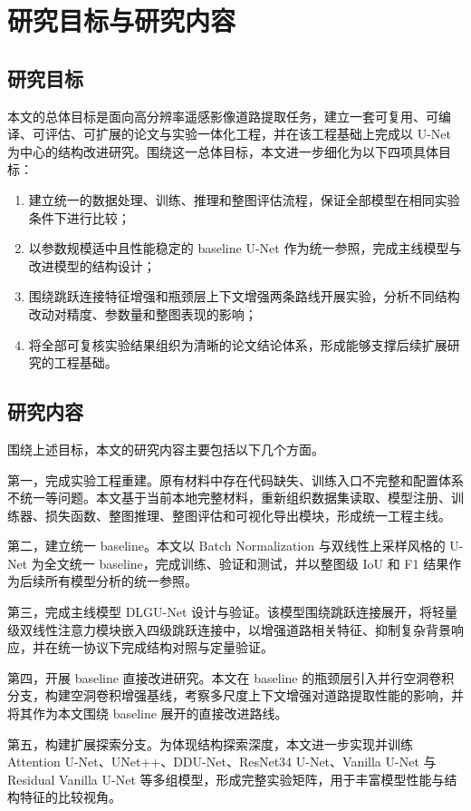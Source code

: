 \section{研究目标与研究内容}
\subsection{研究目标}
本文的总体目标是面向高分辨率遥感影像道路提取任务，建立一套可复用、可编译、可评估、可扩展的论文与实验一体化工程，并在该工程基础上完成以 U-Net 为中心的结构改进研究。围绕这一总体目标，本文进一步细化为以下四项具体目标：
\begin{enumerate}
  \item 建立统一的数据处理、训练、推理和整图评估流程，保证全部模型在相同实验条件下进行比较；
  \item 以参数规模适中且性能稳定的 baseline U-Net 作为统一参照，完成主线模型与改进模型的结构设计；
  \item 围绕跳跃连接特征增强和瓶颈层上下文增强两条路线开展实验，分析不同结构改动对精度、参数量和整图表现的影响；
  \item 将全部可复核实验结果组织为清晰的论文结论体系，形成能够支撑后续扩展研究的工程基础。
\end{enumerate}

\subsection{研究内容}
围绕上述目标，本文的研究内容主要包括以下几个方面。

第一，完成实验工程重建。原有材料中存在代码缺失、训练入口不完整和配置体系不统一等问题。本文基于当前本地完整材料，重新组织数据集读取、模型注册、训练器、损失函数、整图推理、整图评估和可视化导出模块，形成统一工程主线。

第二，建立统一 baseline。本文以 Batch Normalization 与双线性上采样风格的 U-Net 为全文统一 baseline，完成训练、验证和测试，并以整图级 IoU 和 F1 结果作为后续所有模型分析的统一参照。

第三，完成主线模型 DLGU-Net 设计与验证。该模型围绕跳跃连接展开，将轻量级双线性注意力模块嵌入四级跳跃连接中，以增强道路相关特征、抑制复杂背景响应，并在统一协议下完成结构对照与定量验证。

第四，开展 baseline 直接改进研究。本文在 baseline 的瓶颈层引入并行空洞卷积分支，构建空洞卷积增强基线，考察多尺度上下文增强对道路提取性能的影响，并将其作为本文围绕 baseline 展开的直接改进路线。

第五，构建扩展探索分支。为体现结构探索深度，本文进一步实现并训练 Attention U-Net、UNet++、DDU-Net、ResNet34 U-Net、Vanilla U-Net 与 Residual Vanilla U-Net 等多组模型，形成完整实验矩阵，用于丰富模型性能与结构特征的比较视角。

